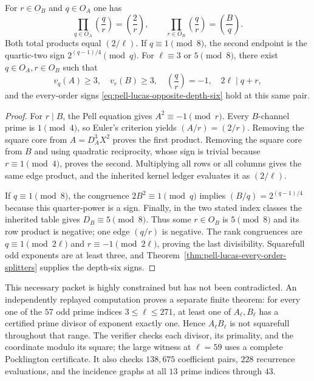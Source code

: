 \begin{theorem}
\label{thm:pell-lucas-vertexwise-incidence}
For $r\in O_B$ and $q\in O_A$ one has
\begin{equation}\label{eq:pell-lucas-row-column-laws}
 \prod_{q\in O_A}\left(\frac qr\right)=\left(\frac2r\right),
 \qquad
 \prod_{r\in O_B}\left(\frac qr\right)=\left(\frac Bq\right).
\end{equation}
Both total products equal $(2/\ell)$.  If $q\equiv1\pmod8$, the second
endpoint is the quartic-two sign $2^{(q-1)/4}\pmod q$.
For $\ell\equiv3$ or $5\pmod8$, there exist $q\in O_A,r\in O_B$ such that
\begin{equation}\label{eq:pell-lucas-forced-opposite-pair}
 v_q(A)\ge3,\quad v_r(B)\ge3,\quad
 \left(\frac qr\right)=-1,\quad 2\ell\mid q+r,
\end{equation}
and the every-order signs \eqref{eq:pell-lucas-opposite-depth-six} hold at
this same pair.
\end{theorem}

\begin{proof}
For $r\mid B$, the Pell equation gives $A^2\equiv-1\pmod r$.  Every
$B$-channel prime is $1\pmod4$, so Euler's criterion yields
$(A/r)=(2/r)$.  Removing the square core from
$A=D_A^3X^2$ proves the first product.  Removing the square core from $B$ and
using quadratic reciprocity, whose sign is trivial because $r\equiv1\pmod4$,
proves the second.  Multiplying all rows or all columns gives the same edge
product, and the inherited kernel ledger evaluates it as $(2/\ell)$.

If $q\equiv1\pmod8$, the congruence $2B^2\equiv1\pmod q$ implies
$(B/q)=2^{(q-1)/4}$ because this quarter-power is a sign.  Finally, in the
two stated index classes the inherited table gives $D_B\equiv5\pmod8$.
Thus some $r\in O_B$ is $5\pmod8$ and its row product is negative; one edge
$(q/r)$ is negative.  The rank congruences are
$q\equiv1\pmod{2\ell}$ and $r\equiv-1\pmod{2\ell}$, proving the last
divisibility.  Squarefull odd exponents are at least three, and
Theorem~\ref{thm:pell-lucas-every-order-splitters} supplies the depth-six
signs.
\end{proof}

This necessary packet is highly constrained but has not been contradicted.
An independently replayed computation proves a separate finite theorem:
for every one of the $57$ odd prime indices $3\le\ell\le271$, at least one
of $A_\ell,B_\ell$ has a certified prime divisor of exponent exactly one.
Hence $A_\ell B_\ell$ is not squarefull throughout that range.  The verifier
checks each divisor, its primality, and the coordinate modulo its square; the
large witness at $\ell=59$ uses a complete Pocklington certificate.  It also
checks $138{,}675$ coefficient pairs, $228$ recurrence evaluations, and the
incidence graphs at all $13$ prime indices through $43$.

